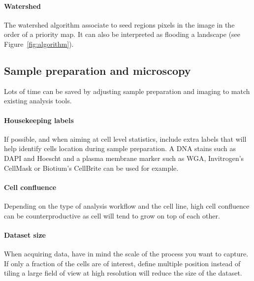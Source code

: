 \paragraph{Watershed} The watershed algorithm associate to seed regions pixels in the image in the order of a priority map. It can also be interpreted as flooding a landscape (see Figure~\ref{fig:algorithm}).

\subsection{Sample preparation and microscopy}

Lots of time can be saved by adjusting sample preparation and imaging to match existing  analysis tools.

\paragraph{Housekeeping labels} If possible, and when aiming at cell level statistics, include extra labels that will help identify cells location during sample preparation. A DNA stains such as DAPI and Hoescht and a plasma membrane marker such as WGA, Invitrogen's CellMask or Biotium's CellBrite can be used for example. 

\paragraph{Cell confluence} Depending on the type of analysis workflow and the cell line, high cell confluence can be counterproductive as cell will tend to grow on top of each other.

\paragraph{Dataset size} When acquiring data, have in mind the scale of the process you want to capture. If only a fraction of the cells are of interest, define multiple position instead of tiling a large field of view at high resolution will reduce the size of the dataset.





